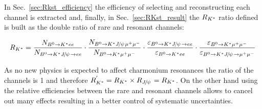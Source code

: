 In Sec.~\ref{sec:Rkst_efficiency} the efficiency of selecting and reconstructing each channel is extracted
and, finally, in Sec.~\ref{sec:RKst_result} the $R_{{{K}^*}}$ ratio defined is built as the double ratio
of rare and resonant channels:

\begin{equation}
R_{\Kstar} = 
 \frac{N_{\Bz\to\Kstar ee}}{N_{\Bz\to\Kstar\jpsi\to ee}} 
\cdot \frac{N_{\Bz\to\Kstar \jpsi \mumu}}{N_{\Bz\to\Kstar\mumu}}
\cdot \frac{\varepsilon_{\Bz\to\Kstar \jpsi \to ee}}{\varepsilon_{\Bz\to\Kstar ee}} 
\cdot \frac{\varepsilon_{\Bz\to\Kstar \mumu}}{\varepsilon_{\Bz\to\Kstar\jpsi\to \mumu}}
\end{equation}

As no new physics is expected to affect charmonium resonances the ratio of the \jpsi channels
is 1 and therefore $R_{\Kstar}^{'} = R_{\Kstar} \times R_{\jpsi} = R_{\Kstar}$.
On the other hand using the relative efficiencies between the rare and resonant channels
allows to cancel out many effects resulting in a better control of systematic uncertainties.  





